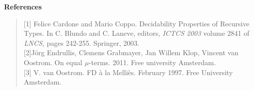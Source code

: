 \documentclass[11pt,aslarticle,xperspectives,bibay3]{asl}
\begin{document}
{\newenvironment{References} {\begin{center}\textbf{References}\end{center} \begin{quote}} {\end{quote}}
\begin{References}
[1] Felice Cardone and Mario Coppo. Decidability Properties of Recursive Types. In C. Blundo and C. Laneve, editors, {\it ICTCS 2003} volume 2841 of {\it LNCS,} pages 242-255. Springer, 2003.\\[1em]
[2]J\"org Endrullis, Clemens Grabmayer, Jan Willem Klop, Vincent van Oostrom. On equal $\mu$-terms. 2011. Free university Amsterdam.\\[1em]
[3] V. van Oostrom. FD \`a la Melli\`es. February 1997. Free  University Amsterdam.
\end{References}
\end{document}
